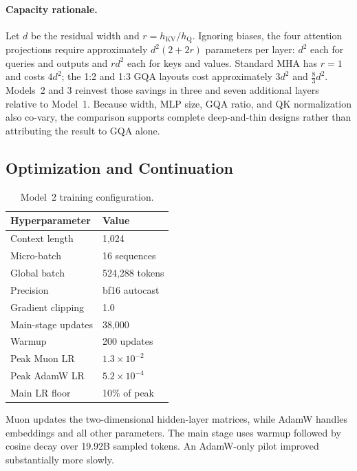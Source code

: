 \documentclass{article}
\begin{document}
\paragraph{Capacity rationale.}
Let $d$ be the residual width and $r=h_{\mathrm{KV}}/h_{\mathrm{Q}}$. Ignoring
biases, the four attention projections require approximately
$d^2(2+2r)$ parameters per layer: $d^2$ each for queries and outputs and
$rd^2$ each for keys and values. Standard MHA has $r=1$ and costs $4d^2$;
the 1:2 and 1:3 GQA layouts cost approximately $3d^2$ and
$\frac{8}{3}d^2$. Models~2 and 3 reinvest those savings in three and seven
additional layers relative to Model~1. Because width, MLP size, GQA ratio,
and QK normalization also co-vary, the comparison supports complete
deep-and-thin designs rather than attributing the result to GQA alone.

\subsection{Optimization and Continuation}

\begin{table}
  \vspace{-0.8\baselineskip}
  \caption{Model~2 training configuration.}
  \label{tab:training-config}
  \centering
  \small
  \setlength{\tabcolsep}{4pt}
  \begin{tabular*}{\linewidth}{@{\extracolsep{\fill}}ll@{}}
    \toprule
    Hyperparameter & Value \\
    \midrule
    Context length & 1,024 \\
    Micro-batch & 16 sequences \\
    Global batch & 524,288 tokens \\
    Precision & bf16 autocast \\
    Gradient clipping & 1.0 \\
    Main-stage updates & 38,000 \\
    Warmup & 200 updates \\
    Peak Muon LR & $1.3{\times}10^{-2}$ \\
    Peak AdamW LR & $5.2{\times}10^{-4}$ \\
    Main LR floor & 10\% of peak \\
    \bottomrule
  \end{tabular*}
\end{table}

Muon updates the two-dimensional hidden-layer matrices, while AdamW handles
embeddings and all other parameters. The main stage uses warmup followed by
cosine decay over 19.92B sampled tokens. An AdamW-only pilot improved
substantially more slowly.
\end{document}
